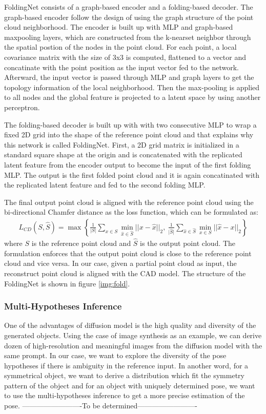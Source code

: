 \documentclass[12pt,DIV14,BCOR12mm,a4paper,footinclude=false,headinclude,parskip=half-,twoside,openright,cleardoublepage=empty,toc=index,bibliography=totoc,listof=totoc]{scrreprt}
\numberwithin{equation}{chapter}
\begin{document}
FoldingNet consists of a graph-based encoder and a folding-based decoder. The graph-based encoder follow the design of \cite{shen2018mining} using the graph structure of the point cloud neighborhood. The encoder is built up with MLP and graph-based maxpooling layers, which are constructed from the k-nearset neighbor through the spatial postion of the nodes in the point cloud. For each point, a local covariance matrix with the size of 3x3 is computed, flattened to a vector and concatinate with the point position as the input vector fed to the network. Afterward, the input vector is passed through MLP and graph layers to get the topology information of the local neighborhood. Then the max-pooling is applied to all nodes and the global feature is projected to a latent space by using another perceptron.

The folding-based decoder is built up with with two consecutive MLP to wrap a fixed 2D grid into the shape of the reference point cloud and that explains why this network is called FoldingNet. First, a 2D grid matrix is initialized in a standard square shape at the origin and is concatenated with the replicated latent feature from the encoder output to become the input of the first folding MLP. The output is the first folded point cloud and it is again concatinated with the replicated latent feature and fed to the second folding MLP.

The final output point cloud is aligned with the reference point cloud using the bi-directional Chamfer distance as the loss function, which can be formulated as:
\begin{align}
  L_{CD}(S, \hat{S}) = \max \left\{\frac{1}{\lvert S\rvert }\mathop{\sum}_{x\in S} \mathop{\min}_{\hat{x}\in \hat{S}}||x-\hat{x}||_{2} ,\ \frac{1}{\lvert \hat{S}\rvert }\mathop{\sum}_{\hat{x}\in \hat{S}} \mathop{\min}_{x\in S}||\hat{x}-x||_{2}\right\}
\end{align}
where $S$ is the reference point cloud and $\hat{S}$ is the output point cloud. The formulation enforces that the output point cloud is close to the reference point cloud and vice versa. In our case, given a partial point cloud as input, the reconstruct point cloud is aligned with the CAD model. The structure of the FoldingNet is shown in figure \ref{img:fold}.
\subsubsection{Multi-Hypotheses Inference}
One of the advantages of diffusion model is the high quality and diversity of the generated objects. Using the case of image synthesis as an example, we can derive dozen of high-resolution and meaningful images from the diffusion model with the same prompt. In our case, we want to explore the diversity of the pose hypotheses if there is ambiguity in the reference input. In another word, for a symmetrical object, we want to derive a distribution which fit the symmetry pattern of the object and for an object with uniquely determined pose, we want to use the multi-hypotheses inference to get a more precise estimation of the pose.
-------------------------To be determined-------------------------
\end{document}
